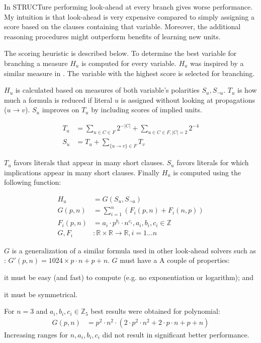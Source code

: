 In STRUCTure performing look-ahead at every branch gives worse
performance. My intuition is that look-ahead is very expensive
compared to simply assigning a score based on the clauses containing
that variable. Moreover, the additional reasoning procedures might
outperform benefits of learning new units.

The scoring heuristic is described below. To determine the
best variable for branching a measure $H_u$ is computed for
every variable.  $H_u$ was inspired by a similar measure in
\cite{mine:oksolver}. The variable with the highest score is selected
for branching.

$H_u$ is calculated based on measures of both variable's polarities
$S_u, S_{\neg u}$. $T_u$ is how much a formula is reduced if literal
$u$ is assigned without looking at propagations ($u \rightarrow
v$). $S_u$ improves on $T_u$ by including scores of implied units.

\begin{align}
  T_u &= \sum_{u \in C \in F}{2^{-|C|}} + \sum_{u \in C \in F, |C| = 2}{2^{-4}} \\
  S_u &= T_u + \sum_{\{ u \rightarrow v \} \in F}{T_v}
\end{align}

$T_u$ favors literals that appear in many short clauses.  $S_u$
favors literals for which implications appear in many short clauses.
Finally $H_u$ is computed using the following function:

\begin{align}
  H_u &= G(S_u, S_{\neg u}) \\
  G(p, n) &= \sum_{i=1}^{n}{(F_i(p, n) + F_i(n, p))} \\
  F_i(p, n) &= a_i \cdot p^{b_i} \cdot n^{c_i}, a_i, b_i, c_i \in \mathbb{Z} \\
  G, F_i &: \mathbb{R} \times \mathbb{R} \rightarrow \mathbb{R}, i = 1 \ldots n
\end{align}

$G$ is a generalization of a similar formula used in other
look-ahead solvers such as \cite{mine:march}: $G'(p, n) =
1024 \times p \cdot n + p + n$. $G$ must have a A couple of properties:
\begin{inparaenum}[a)]
  \item it must be easy (and fast) to compute (e.g. no exponentiation or logarithm); and
  \item it must be symmetrical.
\end{inparaenum}

For $n = 3$ and $a_i, b_i, c_i \in \mathbb{Z}_5$ best results were
obtained for polynomial:
\begin{align}
  G(p, n) &=  p^2 \cdot n^2 \cdot (2 \cdot p^2 \cdot n^2 + 2 \cdot p \cdot n + p + n)
\end{align}
Increasing ranges for $n, a_i, b_i, c_i$ did not result in
significant better performance.


